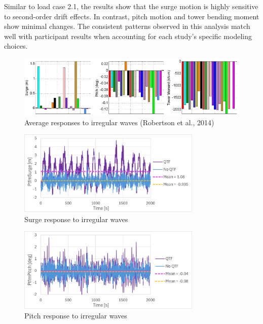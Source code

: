 \documentclass[a4paper, 11pt]{article}
\begin{document}
Similar to load case 2.1, the results show that the surge motion is highly sensitive to second-order drift effects. In contrast, pitch motion and tower bending moment show minimal changes. The consistent patterns observed in this analysis match well with participant results when accounting for each study's specific modeling choices. 

\begin{figure}[H]
    \centering
    \includegraphics[width=1\textwidth]{2.2.png}
    \caption{\small Average responses to irregular waves (Robertson et al., 2014)}
    \label{fig:2.2}
\end{figure}

\begin{figure}[H]
    \centering
    \includegraphics[width=0.78\textwidth]{2.2_surge.png}
    \caption{\small Surge response to irregular waves}
    \label{fig:2.2_surge}
\end{figure}

\begin{figure}[H]
    \centering
    \includegraphics[width=0.78\textwidth]{2.2_pitch.png}
    \caption{\small Pitch response to irregular waves}
    \label{fig:2.2_pitch}
\end{figure}
\end{document}
